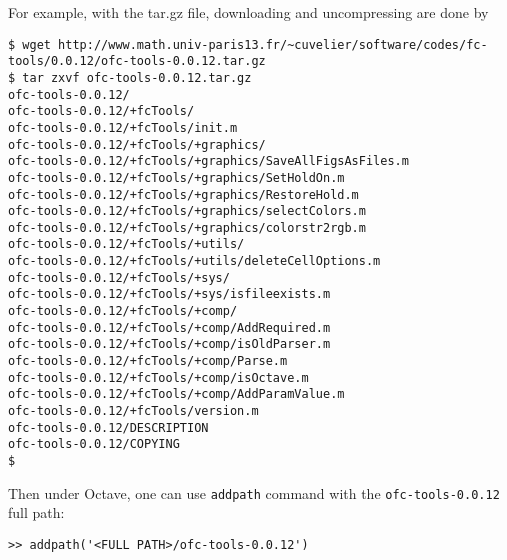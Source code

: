 For example, with the tar.gz file, downloading and uncompressing are done by 
\begin{verbatim}
$ wget http://www.math.univ-paris13.fr/~cuvelier/software/codes/fc-tools/0.0.12/ofc-tools-0.0.12.tar.gz
$ tar zxvf ofc-tools-0.0.12.tar.gz
ofc-tools-0.0.12/
ofc-tools-0.0.12/+fcTools/
ofc-tools-0.0.12/+fcTools/init.m
ofc-tools-0.0.12/+fcTools/+graphics/
ofc-tools-0.0.12/+fcTools/+graphics/SaveAllFigsAsFiles.m
ofc-tools-0.0.12/+fcTools/+graphics/SetHoldOn.m
ofc-tools-0.0.12/+fcTools/+graphics/RestoreHold.m
ofc-tools-0.0.12/+fcTools/+graphics/selectColors.m
ofc-tools-0.0.12/+fcTools/+graphics/colorstr2rgb.m
ofc-tools-0.0.12/+fcTools/+utils/
ofc-tools-0.0.12/+fcTools/+utils/deleteCellOptions.m
ofc-tools-0.0.12/+fcTools/+sys/
ofc-tools-0.0.12/+fcTools/+sys/isfileexists.m
ofc-tools-0.0.12/+fcTools/+comp/
ofc-tools-0.0.12/+fcTools/+comp/AddRequired.m
ofc-tools-0.0.12/+fcTools/+comp/isOldParser.m
ofc-tools-0.0.12/+fcTools/+comp/Parse.m
ofc-tools-0.0.12/+fcTools/+comp/isOctave.m
ofc-tools-0.0.12/+fcTools/+comp/AddParamValue.m
ofc-tools-0.0.12/+fcTools/version.m
ofc-tools-0.0.12/DESCRIPTION
ofc-tools-0.0.12/COPYING
$
\end{verbatim}
Then under Octave, one can use \texttt{addpath} command with the \texttt{ofc-tools-0.0.12} full path:
\begin{verbatim}
>> addpath('<FULL PATH>/ofc-tools-0.0.12')
\end{verbatim}
 






